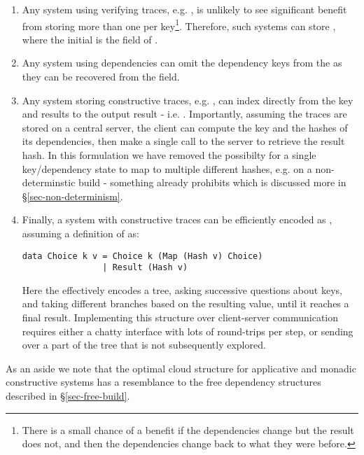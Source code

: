 \begin{enumerate}
\item Any system using verifying traces, e.g. \Shake, is unlikely to see significant benefit from storing more than one  per key\footnote{There is a small chance of a benefit if the dependencies change but the result does not, and then the dependencies change back to what they were before.}. Therefore, such systems can store , where the initial  is the  field of .
\item Any system using  dependencies can omit the dependency keys from the  as they can be recovered from the  field.
\item Any  system storing constructive traces, e.g. \Bazel, can index directly from the key and results to the output result - i.e. . Importantly, assuming the traces are stored on a central server, the client can compute the key and the hashes of its dependencies, then make a single call to the server to retrieve the result hash. In this formulation we have removed the possibilty for a single key/dependency state to map to multiple different hashes, e.g. on a non-determinstic build - something \Bazel already prohibits which is discussed more in \S\ref{sec-non-determinism}.
\item Finally, a  system with constructive traces can be efficiently encoded as , assuming a definition of  as:
\begin{verbatim}
data Choice k v = Choice k (Map (Hash v) Choice)
                | Result (Hash v)
\end{verbatim}
Here the  effectively encodes a tree, asking successive questions about keys, and taking different branches based on the resulting value, until it reaches a final result. Implementing this structure over client-server communication requires either a chatty interface with lots of round-trips per  step, or sending over a part of the tree that is not subsequently explored.
\end{enumerate}

As an aside we note that the optimal cloud structure for applicative and monadic constructive systems has a resemblance to the free dependency structures described in \S\ref{sec-free-build}.

